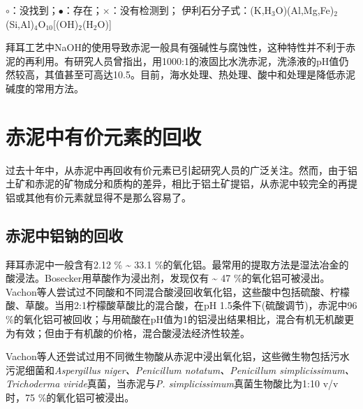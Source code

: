 \begin{table}
\begin{threeparttable}
		$\circ$：没找到；$ \bullet $：存在；$ \times $：没有检测到；
		伊利石分子式：(K,H$ _{\mathrm{3}} $O)(Al,Mg,Fe)$ _{\mathrm{2}} $(Si,Al)$ _{\mathrm{4}} $O$ _{\mathrm{10}} $[(OH)$ _{\mathrm{2}} $(H$ _{\mathrm{2}} $O)]
		\end{threeparttable}
\end{table}

拜耳工艺中NaOH的使用导致赤泥一般具有强碱性与腐蚀性，这种特性并不利于赤泥的再利用。有研究人员曾指出，用1000:1的液固比水洗赤泥，洗涤液的pH值仍然较高，其值甚至可高达10.5\cite{samal2015characterization,shao2016preparation}。目前，海水处理、热处理、酸中和处理是降低赤泥碱度的常用方法\cite{wang2008novel}。

\section{赤泥中有价元素的回收}
过去十年中，从赤泥中再回收有价元素已引起研究人员的广泛关注。然而，由于铝土矿和赤泥的矿物成分和质构的差异，相比于铝土矿提铝，从赤泥中较完全的再提铝或其他有价元素就显得不是那么容易了。
\subsection{赤泥中铝钠的回收}	
拜耳赤泥中一般含有2.12 \%  \textasciitilde{ } 33.1 \%的氧化铝\cite{grafe2011bauxite}。最常用的提取方法是湿法冶金的酸浸法。Bosecker\cite{bosecker1986bacterial}用草酸作为浸出剂，发现仅有 \textasciitilde{ }47 \%的氧化铝可被浸出。Vachon\cite{vachon1994chemical}等人尝试过不同酸和不同混合酸浸回收氧化铝，这些酸中包括硫酸、柠檬酸、草酸。当用2:1柠檬酸草酸比的混合酸，在pH 1.5条件下(硫酸调节)，赤泥中96 \%的氧化铝可被回收；与用硫酸在pH值为1的铝浸出结果相比，混合有机无机酸更为有效；但由于有机酸的价格，混合酸浸法经济性较差。

Vachon\cite{vachon1994chemical}等人还尝试过用不同微生物酸从赤泥中浸出氧化铝，这些微生物包括污水污泥细菌和\textit{Aspergillus niger、Penicillum notatum、Penicillum simplicissimum、Trichoderma viride}真菌，当赤泥与\textit{P. simplicissimum}真菌生物酸比为1:10 v/v 时，75 \%的氧化铝可被浸出。

